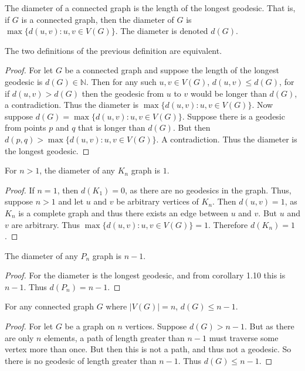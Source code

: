 \documentclass[crop=false,class=book,oneside]{standalone}
\begin{document}
\begin{definition}
The diameter of a connected graph is the length of the longest geodesic. That is, if $G$ is a connected graph, then the diameter of $G$ is $\max\{d(u,v): u,v\in V(G)\}$. The diameter is denoted $d(G)$.
\end{definition}
\begin{corollary}
The two definitions of the previous definition are equivalent.
\end{corollary}
\begin{proof}
For let $G$ be a connected graph and suppose the length of the longest geodesic is $d(G)\in \mathbb{N}$. Then for any such $u,v\in V(G)$, $d(u,v) \leq d(G)$, for if $d(u,v)> d(G)$ then the geodesic from $u$ to $v$ would be longer than $d(G)$, a contradiction. Thus the diameter is $\max\{d(u,v):u,v\in V(G)\}$. Now suppose $d(G) = \max\{d(u,v):u,v \in V(G)\}$. Suppose there is a geodesic from points $p$ and $q$ that is longer than $d(G)$. But then $d(p,q)>\max\{d(u,v):u,v\in V(G)\}$. A contradiction. Thus the diameter is the longest geodesic.
\end{proof}
\begin{corollary}
For $n>1$, the diameter of any $K_n$ graph is $1$.
\end{corollary}
\begin{proof}
If $n=1$, then $d(K_1) = 0$, as there are no geodesics in the graph. Thus, suppose $n>1$ and let $u$ and $v$ be arbitrary vertices of $K_n$. Then $d(u,v)=1$, as $K_n$ is a complete graph and thus there exists an edge between $u$ and $v$. But $u$ and $v$ are arbitrary. Thus $\max\{d(u,v):u,v\in V(G)\} = 1$. Therefore $d(K_n) = 1$.
\end{proof}
\begin{corollary}
The diameter of any $P_n$ graph is $n-1$.
\end{corollary}
\begin{proof}
For the diameter is the longest geodesic, and from corollary 1.10 this is $n-1$. Thus $d(P_n) = n-1$.
\end{proof}
\begin{corollary}
For any connected graph $G$ where $|V(G)| = n$, $d(G) \leq n-1$.
\end{corollary}
\begin{proof}
For let $G$ be a graph on $n$ vertices. Suppose $d(G)>n-1$. But as there are only $n$ elements, a path of length greater than $n-1$ must traverse some vertex more than once. But then this is not a path, and thus not a geodesic. So there is no geodesic of length greater than $n-1$. Thus $d(G)\leq n-1$.
\end{proof}
\end{document}
